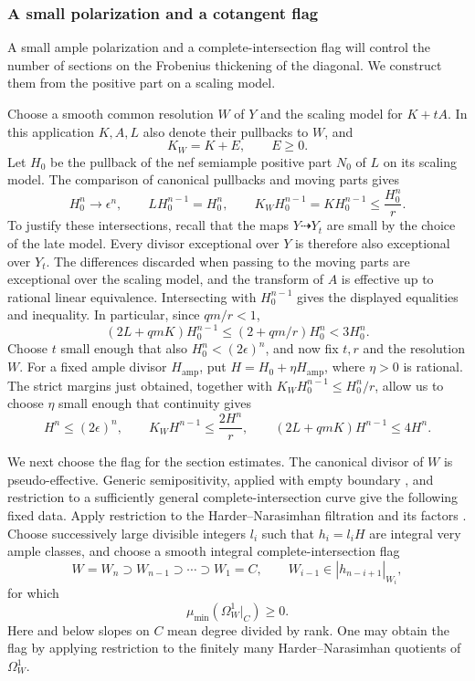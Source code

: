 \subsubsection{A small polarization and a cotangent flag}

A small ample polarization and a complete-intersection flag will
control the number of sections on the Frobenius thickening of the
diagonal. We construct them from the positive part on a scaling model.

Choose a smooth common resolution \(W\) of \(Y\) and the scaling model
for \(K+tA\). In this application \(K,A,L\) also denote their pullbacks to
\(W\), and
\[
 K_W=K+E,\qquad E\geq0.
\]
Let \(H_0\) be the pullback of the nef semiample positive part \(N_0\) of
\(L\) on its scaling model. The comparison of canonical pullbacks and
moving parts gives
\begin{equation}
\label{fr:limit-intersections}
 H_0^n\longrightarrow\epsilon^n,\qquad
 LH_0^{n-1}=H_0^n,\qquad
 K_WH_0^{n-1}=KH_0^{n-1}\leq\frac{H_0^n}{r}.
\end{equation}
To justify these intersections, recall that the maps
\(Y\dashrightarrow Y_t\) are small by the choice of the late model.
Every divisor exceptional over \(Y\) is therefore also exceptional
over \(Y_t\).  The differences discarded when passing to the moving
parts are exceptional over the scaling model, and the transform of
\(A\) is effective up to rational linear equivalence.  Intersecting
with \(H_0^{n-1}\) gives the displayed equalities and inequality.
In particular, since \(qm/r<1\),
\[
 (2L+qmK)H_0^{n-1}
 \le(2+qm/r)H_0^n<3H_0^n.
\]
Choose \(t\) small enough that also \(H_0^n<(2\epsilon)^n\), and
now fix \(t,r\) and the resolution \(W\). For a fixed ample divisor
\(H_{\mathrm{amp}}\), put \(H=H_0+\eta H_{\mathrm{amp}}\), where
\(\eta>0\) is rational. The strict margins just obtained, together
with \(K_WH_0^{n-1}\le H_0^n/r\), allow us to choose \(\eta\)
small enough that continuity gives
\begin{equation}
\label{fr:intersection-bounds}
 H^n\leq(2\epsilon)^n,\qquad
 K_WH^{n-1}\leq\frac{2H^n}{r},\qquad
 (2L+qmK)H^{n-1}\leq4H^n.
\end{equation}

We next choose the flag for the section estimates.  The canonical
divisor of \(W\) is pseudo-effective.  Generic
semipositivity, applied with empty boundary
\cite[Theorem~2.1]{CampanaPaun2015}, and restriction to a sufficiently
general complete-intersection curve give the following fixed data.
Apply restriction to the Harder--Narasimhan filtration and its factors
\cite[Theorem~6.1 and Remark~6.2]{MehtaRamanathan1982}. Choose successively
large divisible integers $l_i$ such that $h_i=l_iH$ are integral very ample
classes, and choose a smooth integral complete-intersection flag
\[
 W=W_n\supset W_{n-1}\supset\cdots\supset W_1=C,
 \qquad W_{i-1}\in |h_{n-i+1}|_{W_i},
\]
for which
\begin{equation}
\label{fr:generic-nef}
 \mu_{\min}(\Omega_W^1|_C)\geq0.
\end{equation}
Here and below slopes on \(C\) mean degree divided by rank. One may
obtain the flag by applying restriction to the finitely many
Harder--Narasimhan quotients of \(\Omega_W^1\).

